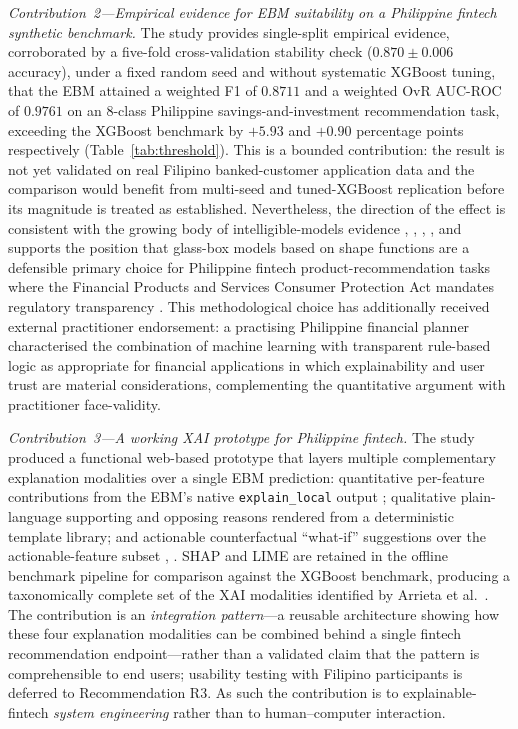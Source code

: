\documentclass[journal]{./IEEE/IEEEtran}
\begin{document}
\textit{Contribution~2---Empirical evidence for EBM suitability on a Philippine fintech synthetic benchmark.} The study provides single-split empirical evidence, corroborated by a five-fold cross-validation stability check ($0.870 \pm 0.006$ accuracy), under a fixed random seed and without systematic XGBoost tuning, that the EBM attained a weighted F1 of $0.8711$ and a weighted OvR AUC-ROC of $0.9761$ on an 8-class Philippine savings-and-investment recommendation task, exceeding the XGBoost benchmark by $+5.93$ and $+0.90$ percentage points respectively (Table~\ref{tab:threshold}). This is a bounded contribution: the result is not yet validated on real Filipino banked-customer application data and the comparison would benefit from multi-seed and tuned-XGBoost replication \cite{ref68} before its magnitude is treated as established. Nevertheless, the direction of the effect is consistent with the growing body of intelligible-models evidence \cite{ref15}, \cite{ref48}, \cite{ref49}, \cite{ref50}, and supports the position that glass-box models based on shape functions are a defensible primary choice for Philippine fintech product-recommendation tasks where the Financial Products and Services Consumer Protection Act \cite{ref44} mandates regulatory transparency \cite{ref51}. This methodological choice has additionally received external practitioner endorsement: a practising Philippine financial planner characterised the combination of machine learning with transparent rule-based logic as appropriate for financial applications in which explainability and user trust are material considerations, complementing the quantitative argument with practitioner face-validity.

\textit{Contribution~3---A working XAI prototype for Philippine fintech.} The study produced a functional web-based prototype that layers multiple complementary explanation modalities over a single EBM prediction: quantitative per-feature contributions from the EBM's native \texttt{explain\_local} output \cite{ref15}; qualitative plain-language supporting and opposing reasons rendered from a deterministic template library; and actionable counterfactual ``what-if'' suggestions over the actionable-feature subset \cite{ref20}, \cite{ref86}. SHAP \cite{ref18} and LIME \cite{ref19} are retained in the offline benchmark pipeline for comparison against the XGBoost benchmark, producing a taxonomically complete set of the XAI modalities identified by Arrieta et al.\ \cite{ref17}. The contribution is an \emph{integration pattern}---a reusable architecture showing how these four explanation modalities can be combined behind a single fintech recommendation endpoint---rather than a validated claim that the pattern is comprehensible to end users; usability testing with Filipino participants is deferred to Recommendation R3. As such the contribution is to explainable-fintech \emph{system engineering} rather than to human--computer interaction.
\end{document}
